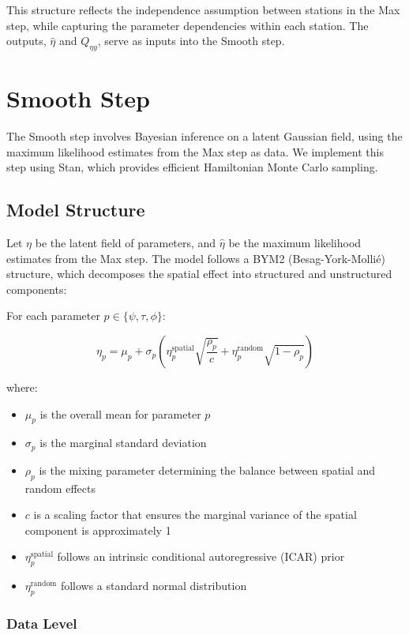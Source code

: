\documentclass[
  letterpaper,
  DIV=11,
  numbers=noendperiod]{scrartcl}
\providecommand{\tightlist}{%
  \setlength{\itemsep}{0pt}\setlength{\parskip}{0pt}}\usepackage{longtable,booktabs,array}
\begin{document}
This structure reflects the independence assumption between stations in
the Max step, while capturing the parameter dependencies within each
station. The outputs, \(\hat \eta\) and \(Q_{\eta y}\), serve as inputs
into the Smooth step.

\section{Smooth Step}\label{smooth-step}

The Smooth step involves Bayesian inference on a latent Gaussian field,
using the maximum likelihood estimates from the Max step as data. We
implement this step using Stan, which provides efficient Hamiltonian
Monte Carlo sampling.

\subsection{Model Structure}\label{model-structure}

Let \(\eta\) be the latent field of parameters, and \(\hat{\eta}\) be
the maximum likelihood estimates from the Max step. The model follows a
BYM2 (Besag-York-Mollié) structure, which decomposes the spatial effect
into structured and unstructured components:

For each parameter \(p \in \{\psi, \tau, \phi\}\):

\[
\eta_p = \mu_p + \sigma_p\left(\eta^{\text{spatial}}_p\sqrt{\frac{\rho_p}{c}} + \eta^{\text{random}}_p\sqrt{1-\rho_p}\right)
\]

where:

\begin{itemize}
\tightlist
\item
  \(\mu_p\) is the overall mean for parameter \(p\)
\item
  \(\sigma_p\) is the marginal standard deviation
\item
  \(\rho_p\) is the mixing parameter determining the balance between
  spatial and random effects
\item
  \(c\) is a scaling factor that ensures the marginal variance of the
  spatial component is approximately 1
\item
  \(\eta^{\text{spatial}}_p\) follows an intrinsic conditional
  autoregressive (ICAR) prior
\item
  \(\eta^{\text{random}}_p\) follows a standard normal distribution
\end{itemize}

\subsubsection{Data Level}\label{data-level}
\end{document}
